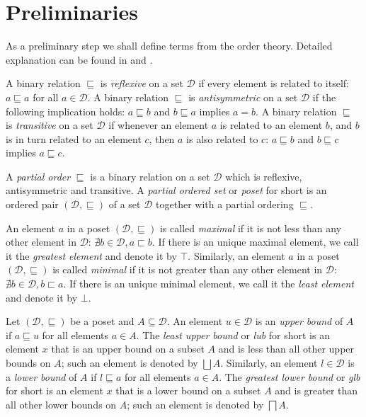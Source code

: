 \documentclass[a4paper]{book}
\begin{document}
\chapter{Preliminaries}

As a preliminary step we shall define terms from the order theory.
Detailed explanation can be found in \cite{DP02} and \cite{BCG02}.

A binary relation $\sqsubseteq$ is \emph{reflexive} on a set
$\mathcal{D}$ if every element is related to itself: $a \sqsubseteq a$
for all $a \in \mathcal{D}$.  A binary relation $\sqsubseteq$ is
\emph{antisymmetric} on a set $\mathcal{D}$ if the following
implication holds: $a \sqsubseteq b$ and $b \sqsubseteq a$ implies $a
= b$.  A binary relation $\sqsubseteq$ is \emph{transitive} on a set
$\mathcal{D}$ if whenever an element $a$ is related to an element $b$,
and $b$ is in turn related to an element $c$, then $a$ is also related
to $c$: $a \sqsubseteq b$ and $b \sqsubseteq c$ implies $a \sqsubseteq
c$.

A \emph{partial order} $\sqsubseteq$ is a binary relation on a set
$\mathcal{D}$ which is reflexive, antisymmetric and transitive.  A
\emph{partial ordered set} or \emph{poset} for short is an ordered
pair $(\mathcal{D}, \sqsubseteq)$ of a set $\mathcal{D}$ together with
a partial ordering $\sqsubseteq$.

An element $a$ in a poset $(\mathcal{D}, \sqsubseteq)$ is called
\emph{maximal} if it is not less than any other element in
$\mathcal{D}$: $\nexists b \in \mathcal{D}, a \sqsubset b$.  If there
is an unique maximal element, we call it the \emph{greatest element}
and denote it by $\top$.  Similarly, an element $a$ in a poset
$(\mathcal{D}, \sqsubseteq)$ is called \emph{minimal} if it is not
greater than any other element in $\mathcal{D}$: $\nexists b \in
\mathcal{D}, b \sqsubset a$.  If there is an unique minimal element,
we call it the \emph{least element} and denote it by $\bot$.

Let $(\mathcal{D}, \sqsubseteq)$ be a poset and $A \subseteq
\mathcal{D}$.  An element $u \in \mathcal{D}$ is an \emph{upper bound}
of $A$ if $a \sqsubseteq u$ for all elements $a \in A$. The
\emph{least upper bound} or \emph{lub} for short is an element $x$
that is an upper bound on a subset $A$ and is less than all other
upper bounds on $A$; such an element is denoted by $\bigsqcup A$.
Similarly, an element $l \in \mathcal{D}$ is a \emph{lower bound} of
$A$ if $l \sqsubseteq a$ for all elements $a \in A$. The
\emph{greatest lower bound} or \emph{glb} for short is an element $x$
that is a lower bound on a subset $A$ and is greater than all other
lower bounds on $A$; such an element is denoted by $\bigsqcap A$.
\end{document}
